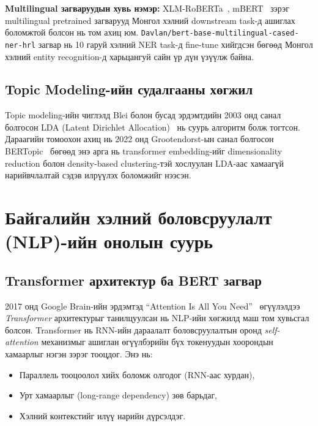 \textbf{Multilingual загваруудын хувь нэмэр:} XLM-RoBERTa~\cite{conneau2020xlmr}, mBERT~\cite{devlin2019bert} зэрэг multilingual pretrained загварууд Монгол хэлний downstream task-д ашиглах боломжтой болсон нь том ахиц юм. \texttt{Davlan/bert-base-multilingual-cased-ner-hrl} загвар нь 10 гаруй хэлний NER task-д fine-tune хийгдсэн бөгөөд Монгол хэлний entity recognition-д харьцангуй сайн үр дүн үзүүлж байна.

\subsection{Topic Modeling-ийн судалгааны хөгжил}

Topic modeling-ийн чиглэлд Blei болон бусад эрдэмтдийн 2003 онд санал болгосон LDA (Latent Dirichlet Allocation)~\cite{blei2003lda} нь суурь алгоритм болж тогтсон. Дараагийн томоохон ахиц нь 2022 онд Grootendorst-ын санал болгосон BERTopic~\cite{grootendorst2022bertopic} бөгөөд энэ арга нь transformer embedding-ийг dimensionality reduction болон density-based clustering-тэй хослуулан LDA-аас хамаагүй нарийвчлалтай сэдэв илрүүлэх боломжийг нээсэн.

\section{Байгалийн хэлний боловсруулалт (NLP)-ийн онолын суурь}

\subsection{Transformer архитектур ба BERT загвар}

2017 онд Google Brain-ийн эрдэмтэд ``Attention Is All You Need''~\cite{vaswani2017attention} өгүүлэлдээ \textit{Transformer} архитектурыг танилцуулсан нь NLP-ийн хөгжилд маш том хувьсгал болсон. Transformer нь RNN-ийн дараалалт боловсруулалтын оронд \textit{self-attention} механизмыг ашиглан өгүүлбэрийн бүх токенуудын хоорондын хамаарлыг нэгэн зэрэг тооцдог. Энэ нь:
\begin{itemize}
    \item Параллель тооцоолол хийх боломж олгодог (RNN-аас хурдан),
    \item Урт хамаарлыг (long-range dependency) зөв барьдаг,
    \item Хэлний контекстийг илүү нарийн дүрсэлдэг.
\end{itemize}

